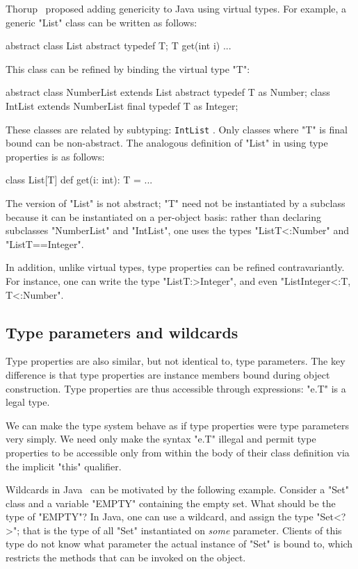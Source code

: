 Thorup~\cite{thorup97}
proposed adding genericity to Java using virtual types.  For example,
a generic \xcd"List" class can be written as follows:
{\footnotesize
\begin{xten}
abstract class List {
  abstract typedef T;
  T get(int i) { ... }
}
\end{xten}}
\noindent
This class can be refined by binding the virtual type \xcd"T":
{\footnotesize
\begin{xten}
abstract class NumberList extends List {
  abstract typedef T as Number;
}
class IntList extends NumberList {
  final typedef T as Integer;
}
\end{xten}}
\noindent
These classes are related by subtyping:
{\tt IntList}  .
Only classes where \xcd"T" is final bound can be non-abstract.
%
The analogous definition of 
\xcd"List" in \Xten{} using type properties is as follows:
{\footnotesize
\begin{xten}
class List[T] {
  def get(i: int): T = { ... }
}
\end{xten}}

The \Xten{} version of \xcd"List" is not abstract;
\xcd"T" need not be instantiated by a subclass because it can be
instantiated on a per-object basis:
rather than declaring subclasses
\xcd"NumberList" and \xcd"IntList", 
one uses the types
\xcd"List{T<:Number}" and \xcd"List{T==Integer}".

In addition,
unlike virtual types, type properties can be refined contravariantly.
For instance, one can write the type \xcd"List{T:>Integer}",
and even \xcd"List{Integer<:T, T<:Number}".

\subsection{Type parameters and wildcards}
\label{sec:parameters-vs-fields}

Type properties are also similar, but not identical to, type
parameters.  The key difference is that type properties are
instance members bound during object construction.  Type
properties are thus accessible through expressions: \xcd"e.T" is
a legal type.

We can make the type system behave as if type properties were
type parameters very simply.  We need only make the syntax \xcd"e.T"
illegal and permit type properties to be accessible only
from within the body of their class definition via the implicit \xcd"this"
qualifier.

Wildcards in Java~\cite{Java3,adding-wildcards} can be motivated
by the following example.
Consider a \xcd"Set" class and a variable \xcd"EMPTY" containing
the empty set.  What should be the type of \xcd"EMPTY"?
In Java, one can use a wildcard, and 
assign the type \xcd"Set<?>"; that is the type of all \xcd"Set"
instantiated on {\em some} parameter.  Clients of this
type do not know what parameter the actual instance of \xcd"Set"
is bound to, which restricts the methods that can be invoked on
the object.

